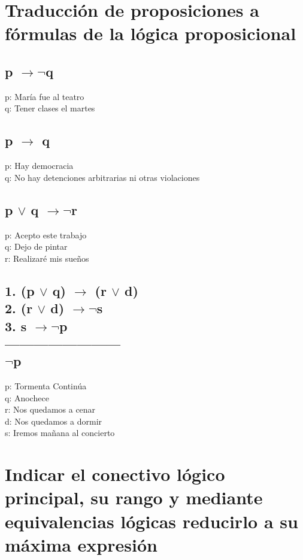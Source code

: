 \documentclass[11pt,letterpaper]{article}
\begin{document}
  \section{Traducción de proposiciones a fórmulas de la lógica proposicional}
  \begin{multicols}{2}
    \subsection{ p $\rightarrow \neg$q}
          p: María fue al teatro \\
          q: Tener clases el martes
    \subsection{ p $\rightarrow$ q}
          p: Hay democracia \\
          q: No hay detenciones arbitrarias ni otras violaciones
    \subsection{ p $\vee$ q $\rightarrow \neg$r}
          p: Acepto este trabajo \\
          q: Dejo de pintar \\
          r: Realizaré mis sueños
    \subsection{1. (p $\vee$ q) $\rightarrow$ (r $\vee$ d) \\
    2. (r $\vee$ d) $\rightarrow \neg$s \\
    3. s $\rightarrow \neg$p \\
    ------------------------ \\
    $\neg$p}
          p: Tormenta Continúa \\
          q: Anochece \\
          r: Nos quedamos a cenar \\
          d: Nos quedamos a dormir \\
          s: Iremos mañana al concierto \\
  \end{multicols}
  \section{Indicar el conectivo lógico principal, su rango y mediante equivalencias lógicas reducirlo a su máxima expresión}
\end{document}

